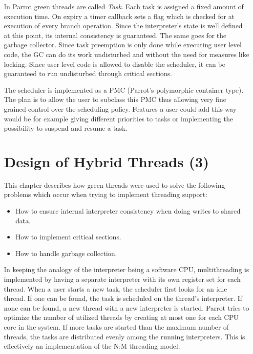 \documentclass[bachelor,english]{hgbthesis}
\begin{document}
In Parrot green threads are called \textit{Task}. Each task is assigned a fixed amount of execution time. On expiry a timer callback sets a flag which is checked for at execution of every branch operation. Since the interpreter's state is well defined at this point, its internal consistency is guaranteed. The same goes for the garbage collector. Since task preemption is only done while executing user level code, the GC can do its work undisturbed and without the need for measures like locking. Since user level code is allowed to disable the scheduler, it can be guaranteed to run undisturbed through critical sections.

The scheduler is implemented as a PMC (Parrot's polymorphic container type). The plan is to allow the user to subclass this PMC thus allowing very fine grained control over the scheduling policy. Features a user could add this way would be for example giving different priorities to tasks or implementing the possibility to suspend and resume a task.

\chapter{Design of Hybrid Threads (3)}

This chapter describes how green threads were used to solve the following problems which occur when trying to implement threading support:
%
\begin{itemize}
\item How to ensure internal interpreter consistency when doing writes to shared data.
\item How to implement critical sections.
\item How to handle garbage collection.
\end{itemize}

In keeping the analogy of the interpreter being a software CPU, multithreading is implemented by having a separate interpreter with its own register set for each thread. When a user starts a new task, the scheduler first looks for an idle thread. If one can be found, the task is scheduled on the thread's interpreter. If none can be found, a new thread with a new interpreter is started. Parrot tries to optimize the number of utilized threads by creating at most one for each CPU core in the system. If more tasks are started than the maximum number of threads, the tasks are distributed evenly among the running interpreters. This is effectively an implementation of the N:M threading model.
\end{document}
